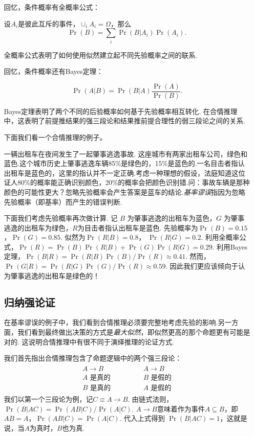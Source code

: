 回忆，条件概率有全概率公式：
\begin{theorem}[全概率公式]
设$A_i$是彼此互斥的事件，$\cup_i A_i=\Omega$，那么
    \[\Pr(B)=\sum_{i}\Pr(B|A_i)\Pr(A_i).\]
\end{theorem}
全概率公式表明了如何使用似然建立起不同先验概率之间的联系.

回忆，条件概率还有Bayes定理：
\begin{theorem}[Bayes定理]
    \[\Pr(A|B) = \Pr(B|A)\frac{\Pr(A)}{\Pr(B)}.\]
\end{theorem}
 Bayes定理表明了两个不同的后验概率如何基于先验概率相互转化. 在合情推理中，这表明了前提推结果的强三段论和结果推前提合理性的弱三段论之间的关系.

 下面我们看一个合情推理的例子。

一辆出租车在夜间发生了一起肇事逃逸事故. 这座城市有两家出租车公司，绿色和蓝色.这个城市历史上肇事逃逸车辆85\%是绿色的，15\%是蓝色的.一名目击者指认出租车是蓝色的，这里的指认并不一定正确.考虑一种理想的假设，法庭知道这位证人80\%的概率能正确识别颜色，20\%的概率会把颜色识别错.问：事故车辆是那种颜色的可能性更大？忽略先验概率会产生答案是蓝车的结论.\emph{基率谬误}指因为忽略先验概率（即基率）而产生的错误判断.

下面我们考虑先验概率再次做计算. 记 $B$ 为肇事逃逸的出租车为蓝色，$G$ 为肇事逃逸的出租车为绿色，$R$为目击者指认出租车是蓝色. 先验概率为$\Pr(B) = 0.15$，$\Pr(G) = 0.85$. 似然为$\Pr(R|B) = 0.8$， $\Pr(R|G) = 0.2$. 利用全概率公式，$\Pr(R) = \Pr(B)\Pr(R|B) + \Pr(G)\Pr(R|G)  =0.29$. 利用Bayes定理，$\Pr(B|R) = \Pr(R|B){\Pr(B)}/{\Pr(R)}\approx 0.41$. 然而，$\Pr(G|R) = \Pr(R|G){\Pr(G)}/{\Pr(R)}\approx 0.59$. 因此我们更应该倾向于认为肇事逃逸的出租车是绿色的！


\subsection{归纳强论证}

在基率谬误的例子中，我们看到合情推理必须要完整地考虑先验的影响.另一方面，我们看到最终做出决策的方式是\emph{最大似然}，即似然更高的那个命题更有可能是对的. 这说明合情推理中有很不同于演绎推理的论证方式.

我们首先指出合情推理包含了命题逻辑中的两个强三段论：
        \[
        \begin{array}{c}
            \begin{array}{c}  
                A \to B \\ A\text{ 是真的} \\ \hline B\text{ 是真的}
            \end{array} 
            \qquad \qquad 
            \begin{array}{c}  
                A \to B \\ B\text{ 是假的} \\ \hline A\text{ 是假的}
            \end{array}
        \end{array} 
    \]
我们以第一个三段论为例，记$C \equiv A \to B$. 由链式法则，$\Pr(B|AC) = \Pr(AB|C) / \Pr(A|C)$. $A \to B$意味着作为事件$A\subseteq B$，即$AB=A$，$\Pr(AB|C) = \Pr(A|C)$. 代入上式得到 $\Pr(B|AC) = 1$，这就是说，当$A$为真时，$B$也为真.

